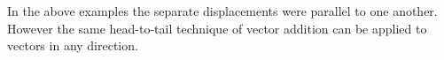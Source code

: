 In the above examples the separate displacements were parallel to one
another. However the same head-to-tail technique of vector addition
can be applied to vectors in any direction.






